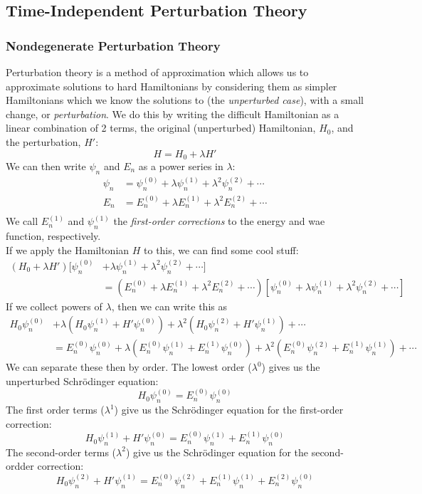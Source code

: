 \documentclass[a4paper]{article}
\begin{document}
\subsection{Time-Independent Perturbation Theory}
\subsubsection{Nondegenerate Perturbation Theory}
Perturbation theory is a method of approximation which allows us to approximate
solutions to hard Hamiltonians by considering them as simpler Hamiltonians
which we know the solutions to (the \emph{unperturbed case}), with a small
change, or \emph{perturbation}. We do this by writing the difficult Hamiltonian
as a linear combination of 2 terms, the original (unperturbed) Hamiltonian,
$H_0$, and the perturbation, $H'$:
\[ H = H_0 + \lambda H' \]
We can then write $\psi_n$ and $E_n$ as a power series in $\lambda$:
\begin{align*}
	\psi_n &= \psi_n^{(0)} + \lambda\psi_n^{(1)} + \lambda^2\psi_n^{(2)}
		+ \cdots\\
	E_n &= E_n^{(0)} + \lambda E_n^{(1)} + \lambda^2E_n^{(2)}
		+ \cdots\\
\end{align*}
We call $E_n^{(1)}$ and $\psi_n^{(1)}$ the \emph{first-order corrections} to
the energy and wae function, respectively.\\
If we apply the Hamiltonian $H$ to this, we can find some cool stuff:
\begin{align*}
	(H_0+\lambda H')
	[\psi_n^{(0)} &+ \lambda\psi_n^{(1)} + \lambda^2\psi_n^{(2)} +
	\cdots]\\
	&= (E_n^{(0)} + \lambda E_n^{(1)} + \lambda^2E_n^{(2)} + \cdots)
	[\psi_n^{(0)} + \lambda\psi_n^{(1)} + \lambda^2\psi_n^{(2)} +
	\cdots]
\end{align*}
If we collect powers of $\lambda$, then we can write this as
\begin{align*}
	H_0\psi_n^{(0)} &+
	\lambda(H_0 \psi_n^{(1)} + H' \psi_n^{(0)}) +
	\lambda^2(H_0\psi_n^{(2)} + H' \psi_n^{(1)}) + \cdots\\
	&= E_n^{(0)}\psi_n^{(0)} +
	\lambda(E_n^{(0)}\psi_n^{(1)} + E_n^{(1)}\psi_n^{(0)}) +
	\lambda^2(E_n^{(0)}\psi_n^{(2)} + E_n^{(1)}\psi_n^{(1)}) + \cdots
\end{align*}
We can separate these then by order. The lowest order ($\lambda^0$) gives us
the unperturbed Schr\"odinger equation:
\[ H_0\psi_n^{(0)} = E_n^{(0)}\psi_n^{(0)} \]
The first order terms ($\lambda^1$) give us the Schr\"odinger equation for the
first-order correction:
\[ H_0\psi_n^{(1)} + H'\psi_n^{(0)} =
	E_n^{(0)}\psi_n^{(1)} + E_n^{(1)}\psi_n^{(0)} \]
The second-order terms ($\lambda^2$) give us the Schr\"odinger equation for the
second-ordder correction:
\[ H_0\psi_n^{(2)} + H'\psi_n^{(1)} =
E_n^{(0)}\psi_n^{(2)} + E_n^{(1)}\psi_n^{(1)} + E_n^{(2)}\psi_n^{(0)} \]
\end{document}
